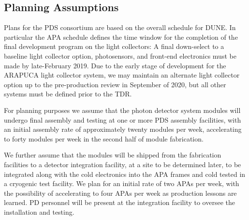 \subsection{Planning Assumptions}
\label{sec:fdsp-pd-org-assmp}


Plans for the PDS consortium are based on the overall schedule for DUNE. In particular the APA schedule defines the time window for the completion of the final development program on the light collectors: A final down-select to a baseline light collector option, photosensors, and front-end electronics must be made by late-February 2019.  Due to the early stage of development for the ARAPUCA light collector system, we may maintain an alternate light collector option up to the pre-production review in September of 2020, but all other systems must be defined prior to the TDR.

For planning purposes we assume that the photon detector system modules will undergo final assembly and testing at one or more PDS assembly facilities, with an initial  assembly rate of approximately twenty modules per week, accelerating to forty modules per week in the second half of module fabrication.

We further assume that the modules will be shipped from the fabrication facilities to a detector integration facility, at a site to be determined later, to be integrated along with the cold electronics into the APA frames and cold tested in a cryogenic test facility.  We plan for an initial rate of two APAs per week, with the possibility of accelerating to four APAs per week as production lessons are learned.  PD personnel will be present at the integration facility to oversee the installation and testing.

